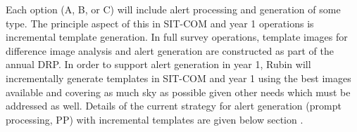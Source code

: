 Each option (A, B, or C) will include alert processing and generation of some type. The principle aspect of this in SIT-COM and year 1 operations is incremental template generation. In full survey operations, template images for difference image analysis and alert generation are constructed as part of the annual DRP. In order to support alert generation in year 1, Rubin will incrementally generate templates in SIT-COM and year 1 using the best images available and covering as much sky as possible given other needs which must be addressed as well. Details of the current strategy for alert generation (prompt processing, PP) with incremental templates are given below section .  
